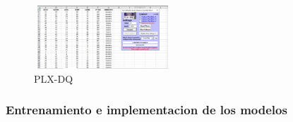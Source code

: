 \documentclass[
]{article}
\begin{document}
\begin{figure}
\centering
\includegraphics[width=2.03125in,height=0.9375in]{PLX.png}
\caption{PLX-DQ}
\end{figure}

\hypertarget{entrenamiento-e-implementacion-de-los-modelos}{%
\subsubsection{Entrenamiento e implementacion de los
modelos}\label{entrenamiento-e-implementacion-de-los-modelos}}
\end{document}

